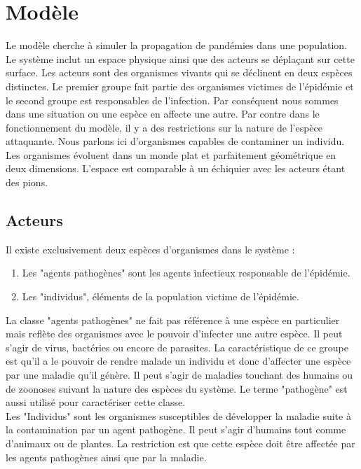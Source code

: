 \chapter{Modèle} \label{ch:modele}

Le modèle cherche à simuler la propagation de pandémies dans une population. Le système inclut un espace physique ainsi que des acteurs se déplaçant sur cette surface. Les acteurs sont des organismes vivants qui se déclinent en deux espèces distinctes. Le premier groupe fait partie des organismes victimes de l'épidémie et le second groupe est responsables de l'infection. Par conséquent nous sommes dans une situation ou une espèce en affecte une autre. Par contre dans le fonctionnement du modèle, il y a des restrictions sur la nature de l'espèce attaquante. Nous parlons ici d'organismes capables de contaminer un individu. \\

Les organismes évoluent dans un monde plat et parfaitement géométrique en deux dimensions. L'espace est comparable à un échiquier avec les acteurs étant des pions.

\section{Acteurs}

Il existe exclusivement deux espèces d'organismes dans le système :

\begin{enumerate}
	\item Les "agents pathogènes" sont les agents infectieux responsable de l'épidémie.
	\item Les "individus", éléments de la population victime de l'épidémie.
\end{enumerate}

La classe "agents pathogènes" ne fait pas référence à une espèce en particulier mais reflète des organismes avec le pouvoir d'infecter une autre espèce. Il peut s'agir de virus, bactéries ou encore de parasites. La caractéristique de ce groupe est qu'il a le pouvoir de rendre malade un individu et donc d'affecter une espèce par une maladie qu'il génère. Il peut s'agir de maladies touchant des humains ou de zoonoses suivant la nature des espèces du système. Le terme "pathogène" est aussi utilisé pour caractériser cette classe.\\

Les "Individus" sont les organismes susceptibles de développer la maladie suite à la contamination par un agent pathogène. Il peut s'agir d'humains tout comme d'animaux ou de plantes. La restriction est que cette espèce doit être affectée par les agents pathogènes ainsi que par la maladie.

